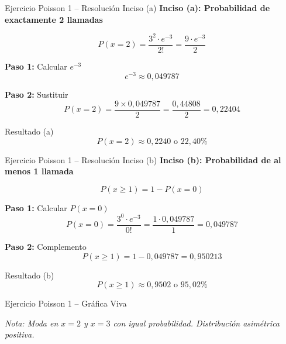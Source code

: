 \documentclass[10pt]{beamer}
\begin{document}
\begin{frame}{Ejercicio Poisson 1 -- Resolución Inciso (a)}
\textbf{Inciso (a): Probabilidad de exactamente 2 llamadas}

\[
P(x=2) = \frac{3^{2} \cdot e^{-3}}{2!} = \frac{9 \cdot e^{-3}}{2}
\]

\textbf{Paso 1:} Calcular $e^{-3}$
\[
e^{-3} \approx 0,049787
\]

\textbf{Paso 2:} Sustituir
\[
P(x=2) = \frac{9 \times 0,049787}{2} = \frac{0,44808}{2} = 0,22404
\]

\begin{block}{Resultado (a)}
\[
\boxed{P(x=2) \approx 0,2240 \text{ o } 22,40\%}
\]
\end{block}
\end{frame}

\begin{frame}{Ejercicio Poisson 1 -- Resolución Inciso (b)}
\textbf{Inciso (b): Probabilidad de al menos 1 llamada}

\[
P(x \geq 1) = 1 - P(x = 0)
\]

\textbf{Paso 1:} Calcular $P(x=0)$
\[
P(x=0) = \frac{3^{0} \cdot e^{-3}}{0!} = \frac{1 \cdot 0,049787}{1} = 0,049787
\]

\textbf{Paso 2:} Complemento
\[
P(x \geq 1) = 1 - 0,049787 = 0,950213
\]

\begin{block}{Resultado (b)}
\[
\boxed{P(x \geq 1) \approx 0,9502 \text{ o } 95,02\%}
\]
\end{block}
\end{frame}

\begin{frame}{Ejercicio Poisson 1 -- Gráfica Viva}
\begin{center}
\end{center}
\footnotesize
\textit{Nota: Moda en $x=2$ y $x=3$ con igual probabilidad. Distribución asimétrica positiva.}
\end{frame}
\end{document}
